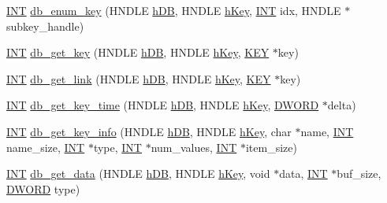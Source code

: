 \begin{DoxyCompactItemize}
\item 
\hyperlink{vppg_8h_a392e62da233ed3e2f7c3fd4f487a3896}{INT} \hyperlink{group__odbfunctionc_gac7c23e0ebd6b203c81ca491db5b4753e}{db\_\-enum\_\-key} (HNDLE \hyperlink{mevb_8c_ab1f60c53f74e806a3b9f687af38d7421}{hDB}, HNDLE \hyperlink{mevb_8c_a8cd567d23219ba7fc83280cf20caf1c2}{hKey}, \hyperlink{vppg_8h_a392e62da233ed3e2f7c3fd4f487a3896}{INT} idx, HNDLE $\ast$subkey\_\-handle)
\item 
\hyperlink{vppg_8h_a392e62da233ed3e2f7c3fd4f487a3896}{INT} \hyperlink{group__odbfunctionc_ga424ad3b166e3fba9bae29f7dfc74a369}{db\_\-get\_\-key} (HNDLE \hyperlink{mevb_8c_ab1f60c53f74e806a3b9f687af38d7421}{hDB}, HNDLE \hyperlink{mevb_8c_a8cd567d23219ba7fc83280cf20caf1c2}{hKey}, \hyperlink{structKEY}{KEY} $\ast$key)
\item 
\hyperlink{vppg_8h_a392e62da233ed3e2f7c3fd4f487a3896}{INT} \hyperlink{group__odbfunctionc_ga331624e7c034494217249e36b97c8f69}{db\_\-get\_\-link} (HNDLE \hyperlink{mevb_8c_ab1f60c53f74e806a3b9f687af38d7421}{hDB}, HNDLE \hyperlink{mevb_8c_a8cd567d23219ba7fc83280cf20caf1c2}{hKey}, \hyperlink{structKEY}{KEY} $\ast$key)
\item 
\hyperlink{vppg_8h_a392e62da233ed3e2f7c3fd4f487a3896}{INT} \hyperlink{group__odbfunctionc_ga78b9946f84f5f8059dd71cc6dbccd1a7}{db\_\-get\_\-key\_\-time} (HNDLE \hyperlink{mevb_8c_ab1f60c53f74e806a3b9f687af38d7421}{hDB}, HNDLE \hyperlink{mevb_8c_a8cd567d23219ba7fc83280cf20caf1c2}{hKey}, \hyperlink{vt2_8h_a798af1e30bc65f319c1a246cecf59e39}{DWORD} $\ast$delta)
\item 
\hyperlink{vppg_8h_a392e62da233ed3e2f7c3fd4f487a3896}{INT} \hyperlink{group__odbfunctionc_ga34deb0b63c67d73975017e47270a5ca9}{db\_\-get\_\-key\_\-info} (HNDLE \hyperlink{mevb_8c_ab1f60c53f74e806a3b9f687af38d7421}{hDB}, HNDLE \hyperlink{mevb_8c_a8cd567d23219ba7fc83280cf20caf1c2}{hKey}, char $\ast$name, \hyperlink{vppg_8h_a392e62da233ed3e2f7c3fd4f487a3896}{INT} name\_\-size, \hyperlink{vppg_8h_a392e62da233ed3e2f7c3fd4f487a3896}{INT} $\ast$type, \hyperlink{vppg_8h_a392e62da233ed3e2f7c3fd4f487a3896}{INT} $\ast$num\_\-values, \hyperlink{vppg_8h_a392e62da233ed3e2f7c3fd4f487a3896}{INT} $\ast$item\_\-size)
\item 
\hyperlink{vppg_8h_a392e62da233ed3e2f7c3fd4f487a3896}{INT} \hyperlink{group__odbfunctionc_ga8d8bb0ee338e5fbc46fed2c29e697540}{db\_\-get\_\-data} (HNDLE \hyperlink{mevb_8c_ab1f60c53f74e806a3b9f687af38d7421}{hDB}, HNDLE \hyperlink{mevb_8c_a8cd567d23219ba7fc83280cf20caf1c2}{hKey}, void $\ast$data, \hyperlink{vppg_8h_a392e62da233ed3e2f7c3fd4f487a3896}{INT} $\ast$buf\_\-size, \hyperlink{vt2_8h_a798af1e30bc65f319c1a246cecf59e39}{DWORD} type)

\end{DoxyCompactItemize}
